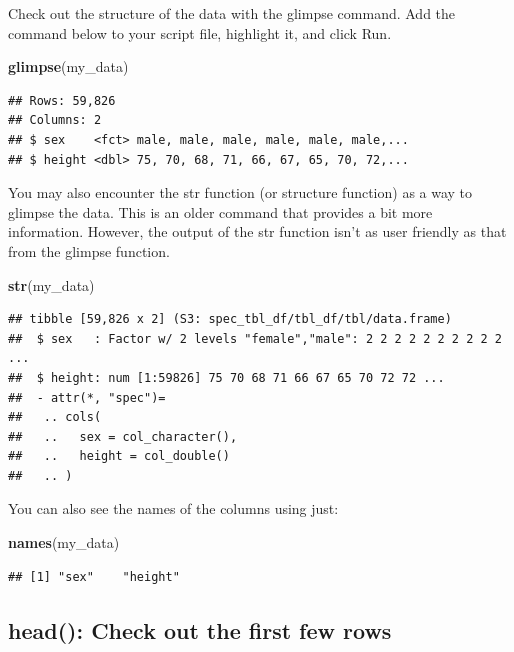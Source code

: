 \documentclass[
]{krantz}
\makeatletter
\newenvironment{Shaded}{\begin{snugshade}}{\end{snugshade}}
\newcommand{\KeywordTok}[1]{\textcolor[rgb]{0.27,0.27,0.27}{\textbf{#1}}}
\newcommand{\NormalTok}[1]{#1}
\newenvironment{kframe}{%
\medskip{}
\setlength{\fboxsep}{.8em}
 \def\at@end@of@kframe{}%
 \ifinner\ifhmode%
  \def\at@end@of@kframe{\end{minipage}}%
  \begin{minipage}{\columnwidth}%
 \fi\fi%
 \def\FrameCommand##1{\hskip\@totalleftmargin \hskip-\fboxsep
 \colorbox{shadecolor}{##1}\hskip-\fboxsep
     \hskip-\linewidth \hskip-\@totalleftmargin \hskip\columnwidth}%
 \MakeFramed {\advance\hsize-\width
   \@totalleftmargin\z@ \linewidth\hsize
   \@setminipage}}%
 {\par\unskip\endMakeFramed%
 \at@end@of@kframe}
\renewenvironment{Shaded}{\begin{kframe}}{\end{kframe}}
\makeatother
\begin{document}
Check out the structure of the data with the glimpse command. Add the command below to your script file, highlight it, and click Run.

\begin{Shaded}
\begin{Highlighting}[]
\KeywordTok{glimpse}\NormalTok{(my_data)}
\end{Highlighting}
\end{Shaded}

\begin{verbatim}
## Rows: 59,826
## Columns: 2
## $ sex    <fct> male, male, male, male, male, male,...
## $ height <dbl> 75, 70, 68, 71, 66, 67, 65, 70, 72,...
\end{verbatim}

You may also encounter the str function (or structure function) as a way to glimpse the data. This is an older command that provides a bit more information. However, the output of the str function isn't as user friendly as that from the glimpse function.

\begin{Shaded}
\begin{Highlighting}[]
\KeywordTok{str}\NormalTok{(my_data)}
\end{Highlighting}
\end{Shaded}

\begin{verbatim}
## tibble [59,826 x 2] (S3: spec_tbl_df/tbl_df/tbl/data.frame)
##  $ sex   : Factor w/ 2 levels "female","male": 2 2 2 2 2 2 2 2 2 2 ...
##  $ height: num [1:59826] 75 70 68 71 66 67 65 70 72 72 ...
##  - attr(*, "spec")=
##   .. cols(
##   ..   sex = col_character(),
##   ..   height = col_double()
##   .. )
\end{verbatim}

You can also see the names of the columns using just:

\begin{Shaded}
\begin{Highlighting}[]
\KeywordTok{names}\NormalTok{(my_data)}
\end{Highlighting}
\end{Shaded}

\begin{verbatim}
## [1] "sex"    "height"
\end{verbatim}

\hypertarget{head-check-out-the-first-few-rows}{%
\subsection{head(): Check out the first few rows}\label{head-check-out-the-first-few-rows}}
\end{document}
